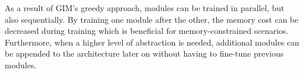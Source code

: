 			As a result of GIM's greedy approach, modules can be trained in parallel, but also sequentially. By training one module after the other, the memory cost can be decreased during training which is beneficial for memory-constrained scenarios. Furthermore, when a higher level of abstraction is needed, additional modules can be appended to the architecture later on without having to fine-tune previous modules.

	

